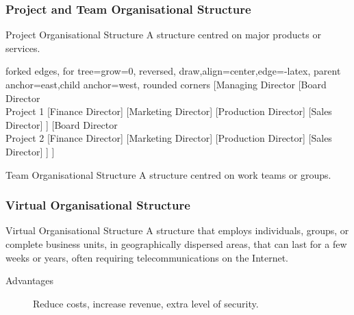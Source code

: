 \documentclass[\main/notes.tex]{subfiles}
\begin{document}
				\subsubsection{Project and Team Organisational Structure}
					\begin{definition}{Project Organisational Structure}
						A structure centred on major products or services.
						\begin{center}
							\begin{forest}
								forked edges,
								for tree={grow=0, reversed, draw,align=center,edge={-latex}, parent anchor=east,child anchor=west, rounded corners}
								[Managing Director
									[Board Director \\ Project 1
										[Finance Director]
										[Marketing  Director]
										[Production  Director]
										[Sales  Director]
									]
									[Board Director \\ Project 2
										[Finance Director]
										[Marketing  Director]
										[Production  Director]
										[Sales  Director]
									]
								]
							\end{forest}
						\end{center}
					\end{definition}
					\begin{definition}{Team Organisational Structure}
						A structure centred on work teams or groups.
					\end{definition}
				\subsubsection{Virtual Organisational Structure}
					\begin{definition}{Virtual Organisational Structure}
						A structure that employs individuals, groups, or complete business units, in geographically dispersed areas, that can last for a few weeks or years, often requiring telecommunications on the Internet.

						\begin{description}
							\item[Advantages] Reduce costs, increase revenue, extra level of security.
						\end{description}
					\end{definition}
			\pagebreak
\end{document}
